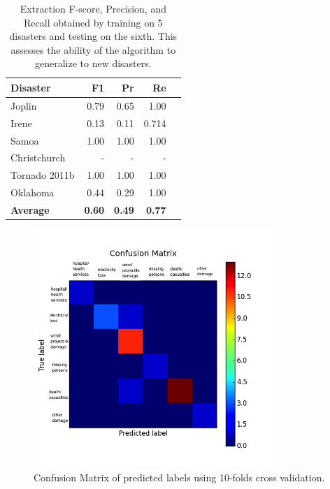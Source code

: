 \documentclass{article}
\begin{document}
\begin{table}[t]
\centering
\small
\begin{tabular}{|l|r|r|r| p{8cm} |}
\hline
{\bf Disaster}  & {\bf F1} & {\bf Pr} & {\bf Re} \\
\hline
Joplin &  0.79  & 0.65       &  1.00 \\
Irene          &  0.13  &    0.11    &  0.714\\
Samoa        &  1.00  & 1.00   &  1.00\\
Christchurch        &  -  & - & - \\
Tornado 2011b     & 1.00 & 1.00   &  1.00\\
Oklahoma       & 0.44 & 0.29 & 1.00 \\
\hline
{\bf Average}  & {\bf 0.60} & {\bf 0.49}  & {\bf 0.77}  \\
\hline
\end{tabular}
\caption{Extraction F-score, Precision, and Recall obtained by training on 5
  disasters and testing on the sixth. This assesses the ability of the
  algorithm to generalize to new disasters. \label{tab.unseen_disaster} }
\end{table}

\begin{figure}[ht!]
\centering
\includegraphics[width=90mm]{confusion_matrix}
\caption{Confusion Matrix of predicted labels using 10-folds cross validation. \label{cm}}
\end{figure}

\end{document}
